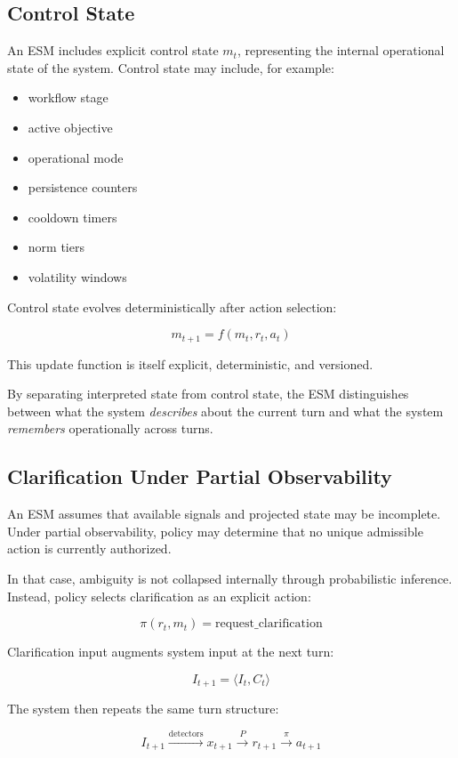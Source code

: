 \documentclass[11pt]{article}
\begin{document}
\subsection{Control State}

An ESM includes explicit control state $m_t$, representing the internal operational state of the system. Control state may include, for example:

\begin{itemize}
  \item workflow stage
  \item active objective
  \item operational mode
  \item persistence counters
  \item cooldown timers
  \item norm tiers
  \item volatility windows
\end{itemize}

Control state evolves deterministically after action selection:

\[
m_{t+1} = f(m_t, r_t, a_t)
\]

This update function is itself explicit, deterministic, and versioned.

By separating interpreted state from control state, the ESM distinguishes between what the system \emph{describes} about the current turn and what the system \emph{remembers} operationally across turns.

\subsection{Clarification Under Partial Observability}

An ESM assumes that available signals and projected state may be incomplete. Under partial observability, policy may determine that no unique admissible action is currently authorized.

In that case, ambiguity is not collapsed internally through probabilistic inference. Instead, policy selects clarification as an explicit action:

\[
\pi(r_t, m_t) = \text{request\_clarification}
\]

Clarification input augments system input at the next turn:

\[
I_{t+1} = \langle I_t, C_t \rangle
\]

The system then repeats the same turn structure:

\[
I_{t+1} \xrightarrow{\text{detectors}} x_{t+1} \xrightarrow{P} r_{t+1} \xrightarrow{\pi} a_{t+1}
\]
\end{document}
